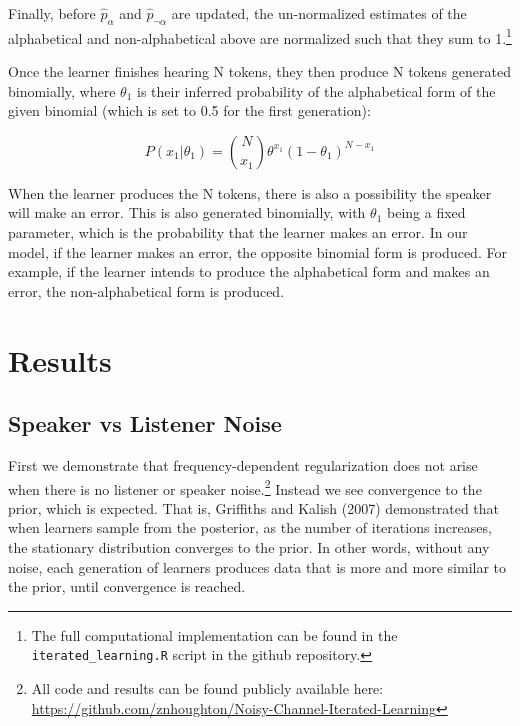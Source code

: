 \documentclass[
  jou,floatsintext]{apa6}
\begin{document}
Finally, before \(\hat{p}_\alpha\) and \(\hat{p}_{\neg\alpha}\) are updated, the un-normalized estimates of the alphabetical and non-alphabetical above are normalized such that they sum to 1.\footnote{The full computational implementation can be found in the \texttt{iterated\_learning.R} script in the github repository.}

Once the learner finishes hearing N tokens, they then produce N tokens generated binomially, where \(\theta_1\) is their inferred probability of the alphabetical form of the given binomial (which is set to 0.5 for the first generation):

\begin{equation}
\label{eq:binomialProd}
P(x_1|\theta_1) = \binom{N}{x_1} \theta^{x_1} (1-\theta_1)^{N-x_1}
\end{equation}

When the learner produces the N tokens, there is also a possibility the speaker will make an error. This is also generated binomially, with \(\theta_1\) being a fixed parameter, which is the probability that the learner makes an error. In our model, if the learner makes an error, the opposite binomial form is produced. For example, if the learner intends to produce the alphabetical form and makes an error, the non-alphabetical form is produced.

\section{Results}\label{results}

\subsection{Speaker vs Listener Noise}\label{speaker-vs-listener-noise}

First we demonstrate that frequency-dependent regularization does not arise when there is no listener or speaker noise.\footnote{All code and results can be found publicly available here: \url{https://github.com/znhoughton/Noisy-Channel-Iterated-Learning}} Instead we see convergence to the prior, which is expected. That is, Griffiths and Kalish (2007) demonstrated that when learners sample from the posterior, as the number of iterations increases, the stationary distribution converges to the prior. In other words, without any noise, each generation of learners produces data that is more and more similar to the prior, until convergence is reached.
\end{document}
